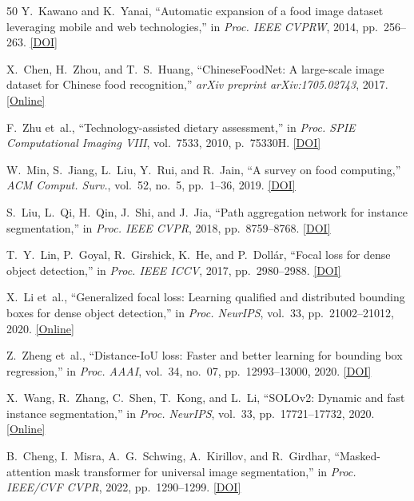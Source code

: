 \documentclass[conference]{IEEEtran}
\begin{document}
\begin{thebibliography}{50}
 Y.~Kawano and K.~Yanai, ``Automatic expansion of a food image dataset leveraging mobile and web technologies,'' in \emph{Proc. IEEE CVPRW}, 2014, pp.~256--263. \href{https://doi.org/10.1109/CVPRW.2014.43}{[DOI]}

 X.~Chen, H.~Zhou, and T.~S.~Huang, ``ChineseFoodNet: A large-scale image dataset for Chinese food recognition,'' \emph{arXiv preprint arXiv:1705.02743}, 2017. \href{https://arxiv.org/abs/1705.02743}{[Online]}

 F.~Zhu et~al., ``Technology-assisted dietary assessment,'' in \emph{Proc. SPIE Computational Imaging VIII}, vol.~7533, 2010, p.~75330H. \href{https://doi.org/10.1117/12.839077}{[DOI]}

 W.~Min, S.~Jiang, L.~Liu, Y.~Rui, and R.~Jain, ``A survey on food computing,'' \emph{ACM Comput. Surv.}, vol.~52, no.~5, pp.~1--36, 2019. \href{https://doi.org/10.1145/3329168}{[DOI]}

 S.~Liu, L.~Qi, H.~Qin, J.~Shi, and J.~Jia, ``Path aggregation network for instance segmentation,'' in \emph{Proc. IEEE CVPR}, 2018, pp.~8759--8768. \href{https://doi.org/10.1109/CVPR.2018.00913}{[DOI]}

 T.~Y.~Lin, P.~Goyal, R.~Girshick, K.~He, and P.~Doll{\'a}r, ``Focal loss for dense object detection,'' in \emph{Proc. IEEE ICCV}, 2017, pp.~2980--2988. \href{https://doi.org/10.1109/ICCV.2017.324}{[DOI]}

 X.~Li et~al., ``Generalized focal loss: Learning qualified and distributed bounding boxes for dense object detection,'' in \emph{Proc. NeurIPS}, vol.~33, pp.~21002--21012, 2020. \href{https://proceedings.neurips.cc/paper/2020/file/f0bda020d2470f2789990230e4f1db3f-Paper.pdf}{[Online]}

 Z.~Zheng et~al., ``Distance-IoU loss: Faster and better learning for bounding box regression,'' in \emph{Proc. AAAI}, vol.~34, no.~07, pp.~12993--13000, 2020. \href{https://doi.org/10.1609/aaai.v34i07.6999}{[DOI]}

 X.~Wang, R.~Zhang, C.~Shen, T.~Kong, and L.~Li, ``SOLOv2: Dynamic and fast instance segmentation,'' in \emph{Proc. NeurIPS}, vol.~33, pp.~17721--17732, 2020. \href{https://proceedings.neurips.cc/paper/2020/file/cd5122f6760ab84dd2e3535d50697204-Paper.pdf}{[Online]}

 B.~Cheng, I.~Misra, A.~G.~Schwing, A.~Kirillov, and R.~Girdhar, ``Masked-attention mask transformer for universal image segmentation,'' in \emph{Proc. IEEE/CVF CVPR}, 2022, pp.~1290--1299. \href{https://doi.org/10.1109/CVPR52688.2022.00135}{[DOI]}


\end{thebibliography}
\end{document}

